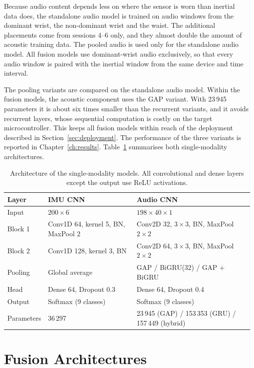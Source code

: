 Because audio content depends less on where the sensor is worn than inertial
data does, the standalone audio model is trained on audio windows from the
dominant wrist, the non-dominant wrist and the waist. The additional placements
come from sessions 4--6 only, and they almost double the amount of acoustic
training data. The pooled audio is used only for
the standalone audio model. All fusion models use dominant-wrist audio
exclusively, so that every audio window is paired with the inertial window from
the same device and time interval.

The pooling variants are compared on the standalone audio model. Within the
fusion models, the acoustic component uses the GAP variant. With 23\,945
parameters it is about six times smaller than the recurrent variants, and it
avoids recurrent layers, whose sequential computation is costly on the target
microcontroller. This keeps all fusion models within reach of the deployment
described in Section~\ref{sec:deployment}. The performance of the three variants is
reported in Chapter~\ref{ch:results}. Table~\ref{tab:single-arch} summarises both
single-modality architectures.

\begin{table}[htbp]
\centering
\small
\renewcommand{\arraystretch}{1.2}
\begin{tabularx}{\textwidth}{|l|X|X|}
\hline
\textbf{Layer} & \textbf{IMU CNN} & \textbf{Audio CNN} \\
\hline
Input & $200 \times 6$ & $198 \times 40 \times 1$ \\
Block 1 & Conv1D 64, kernel 5, BN, MaxPool 2 & Conv2D 32, $3 \times 3$, BN, MaxPool $2 \times 2$ \\
Block 2 & Conv1D 128, kernel 3, BN & Conv2D 64, $3 \times 3$, BN, MaxPool $2 \times 2$ \\
Pooling & Global average & GAP / BiGRU(32) / GAP + BiGRU \\
Head & Dense 64, Dropout 0.3 & Dense 64, Dropout 0.4 \\
Output & Softmax (9 classes) & Softmax (9 classes) \\
\hline
Parameters & 36\,297 & 23\,945 (GAP) / 153\,353 (GRU) / 157\,449 (hybrid) \\
\hline
\end{tabularx}
\caption{Architecture of the single-modality models. All convolutional and dense
layers except the output use ReLU activations.}
\label{tab:single-arch}
\end{table}

\section{Fusion Architectures}
\label{sec:fusion}

